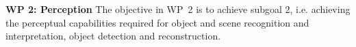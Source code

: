 \begin{description}

\end{description}

\textbf{WP 2: Perception}
The objective in WP~2 is to achieve subgoal 2, i.e. achieving the
perceptual capabilities required for object and scene recognition and
interpretation, object detection and reconstruction. 
